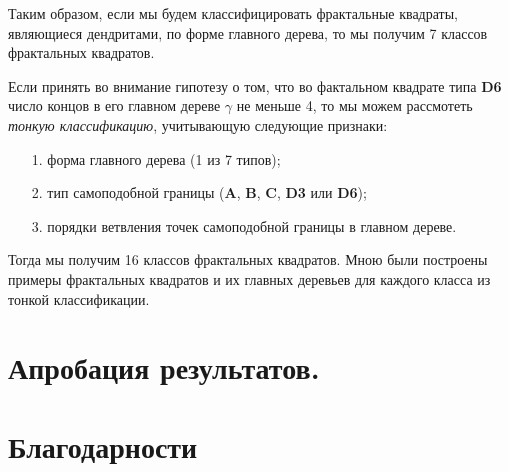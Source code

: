 Таким образом, если мы будем классифицировать фрактальные квадраты, являющиеся дендритами, по форме главного дерева, то мы получим 7 классов фрактальных квадратов.

Если принять во внимание гипотезу о том, что во фактальном квадрате типа {\bf D6} число концов в его главном дереве $\gamma$ не меньше 4, то мы можем рассмотеть {\em тонкую классификацию}, учитывающую следующие признаки:
\begin{itemize}[nolistsep]
	\item[1.] форма главного дерева (1 из 7 типов);
	\item[2.] тип самоподобной границы ({\bf A}, {\bf B}, {\bf C}, {\bf D3} или {\bf D6});
	\item[3.] порядки ветвления точек самоподобной границы в главном дереве.
\end{itemize}
Тогда мы получим 16 классов фрактальных квадратов. 
Мною были построены примеры фрактальных квадратов и их главных деревьев для каждого класса из тонкой классификации.



\section{Апробация результатов.}




\section{Благодарности}



